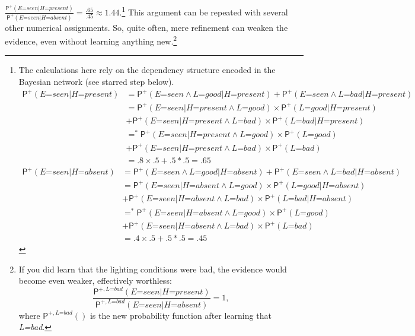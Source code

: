 \documentclass[
  11pt,
  dvipsnames,enabledeprecatedfontcommands]{scrartcl}
\newcommand{\ppr}[2]{\ensuremath{\mathsf{P}^{#1}(#2)}}
\begin{document}
\(\frac{\ppr{+}{\textit{E=seen} \vert \textit{H=present}}}{\ppr{+}{\textit{E=seen} \vert \textit{H=absent}}}=\frac{.65}{.45}\approx 1.44\).\footnote{The
  calculations here rely on the dependency structure encoded in the
  Bayesian network (see starred step below). \begin{align*}
  \ppr{+}{\textit{E=seen} \vert \textit{H=present}} &= \ppr{+}{\textit{E=seen} \wedge \textit{L=good} \vert \textit{H=present}}+\ppr{+}{\textit{E=seen} \wedge \textit{L=bad} \vert \textit{H=present}}\\
  &= \ppr{+}{\textit{E=seen} \vert \textit{H=present} \wedge \textit{L=good}}  \times \ppr{+}{\textit{L=good} \vert  \textit{H=present} }\\ & +\ppr{+}{\textit{E=seen}  \vert \textit{H=present} \wedge \textit{L=bad}} \times \ppr{+}{\textit{L=bad} \vert  \textit{H=present}}\\
  &=^* \ppr{+}{\textit{E=seen} \vert \textit{H=present} \wedge \textit{L=good}}  \times \ppr{+}{\textit{L=good}}\\ & +\ppr{+}{\textit{E=seen}  \vert \textit{H=present} \wedge \textit{L=bad}} \times \ppr{+}{\textit{L=bad}}\\
  &= .8 \times .5 +.5 *.5 = .65 
  \end{align*} \begin{align*}
  \ppr{+}{\textit{E=seen} \vert \textit{H=absent}} &= \ppr{+}{\textit{E=seen} \wedge \textit{L=good} \vert \textit{H=absent}}+\ppr{+}{\textit{E=seen} \wedge \textit{L=bad} \vert \textit{H=absent}}\\
  &= \ppr{+}{\textit{E=seen} \vert \textit{H=absent} \wedge \textit{L=good}}  \times \ppr{+}{\textit{L=good} \vert  \textit{H=absent} }\\ & +\ppr{+}{\textit{E=seen}  \vert \textit{H=absent} \wedge \textit{L=bad}} \times \ppr{+}{\textit{L=bad} \vert  \textit{H=absent}}\\
  &=^* \ppr{+}{\textit{E=seen} \vert \textit{H=absent} \wedge \textit{L=good}}  \times \ppr{+}{\textit{L=good}}\\ & +\ppr{+}{\textit{E=seen}  \vert \textit{H=absent} \wedge \textit{L=bad}} \times \ppr{+}{\textit{L=bad}}\\
  &= .4 \times .5 +.5 *.5 = .45 
  \end{align*}} This argument can be repeated with several other
numerical
assignments. So,
quite often, mere refinement can weaken the evidence, even without
learning anything new.\footnote{If you did learn that the lighting
  conditions were bad, the evidence would become even weaker,
  effectively worthless:
  \[\frac{\ppr{+, \textit{L=bad}}{\textit{E=seen} \vert \textit{H=present}}}{\ppr{+, \textit{L=bad}}{\textit{E=seen} \vert \textit{H=absent}}}=1,\]
  where \(\ppr{+, \textit{L=bad}}{}\) is the new probability function
  after learning that \textit{L=bad}.}
\end{document}
